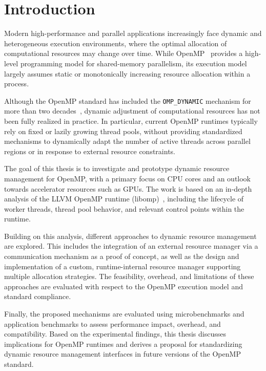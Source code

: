 
\chapter{Introduction}\label{chapter:introduction}

Modern high-performance and parallel applications increasingly face dynamic and heterogeneous execution environments, where the optimal allocation of computational resources may change over time. While OpenMP~\parencite{dagum_openmp_1998} provides a high-level programming model for shared-memory parallelism, its execution model largely assumes static or monotonically increasing resource allocation within a process.

Although the OpenMP standard has included the \texttt{OMP\_DYNAMIC} mechanism for more than two decades~\parencite{openmp60}, dynamic adjustment of computational resources has not been fully realized in practice. In particular, current OpenMP runtimes typically rely on fixed or lazily growing thread pools, without providing standardized mechanisms to dynamically adapt the number of active threads across parallel regions or in response to external resource constraints.

The goal of this thesis is to investigate and prototype dynamic resource management for OpenMP, with a primary focus on CPU cores and an outlook towards accelerator resources such as GPUs. The work is based on an in-depth analysis of the LLVM OpenMP runtime (libomp)~\parencite{noauthor_welcome_nodate}, including the lifecycle of worker threads, thread pool behavior, and relevant control points within the runtime.

Building on this analysis, different approaches to dynamic resource management are explored. This includes the integration of an external resource manager via a communication mechanism as a proof of concept, as well as the design and implementation of a custom, runtime-internal resource manager supporting multiple allocation strategies. The feasibility, overhead, and limitations of these approaches are evaluated with respect to the OpenMP execution model and standard compliance.

Finally, the proposed mechanisms are evaluated using microbenchmarks and application benchmarks to assess performance impact, overhead, and compatibility. Based on the experimental findings, this thesis discusses implications for OpenMP runtimes and derives a proposal for standardizing dynamic resource management interfaces in future versions of the OpenMP standard.
